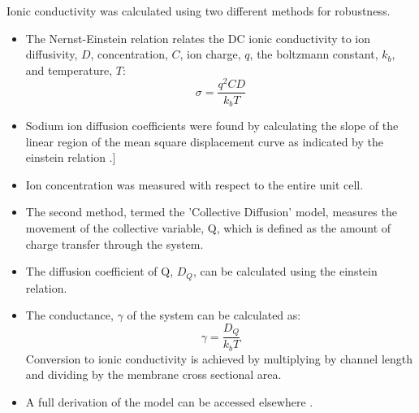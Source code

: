 \documentclass{article}
\begin{document}
  Ionic conductivity was calculated using two different methods for
  robustness.
  \begin{itemize}
    \item The Nernst-Einstein relation relates the DC ionic conductivity to 
    ion diffusivity, $D$, concentration, $C$, ion charge, $q$, the boltzmann 
    constant, $k_b$, and temperature, $T$: $$\sigma = \dfrac{q^2CD}{k_b T}$$  %
    \item Sodium ion diffusion coefficients were found by calculating the slope
    of the linear region of the mean square displacement curve as indicated by
    the einstein relation \cite{einstein_investigations_1956}.]
    \item Ion concentration was measured with respect to the entire unit cell. 
    \item The second method, termed the 'Collective Diffusion' model, measures 
    the movement of the collective variable, Q, which is defined as the amount
    of charge transfer through the system.
    \item The diffusion coefficient of Q, $D_Q$, can be calculated using the 
    einstein relation.
    \item The conductance, $\gamma$ of the system can be calculated as:
    $$ \gamma = \dfrac{D_Q}{k_b T} $$ Conversion to ionic conductivity is
    achieved by multiplying by channel length and dividing by the membrane
    cross sectional area.
    \item A full derivation of the model can be accessed elsewhere \cite{liu_collective_2013}.
  \end{itemize}
    
\end{document}

